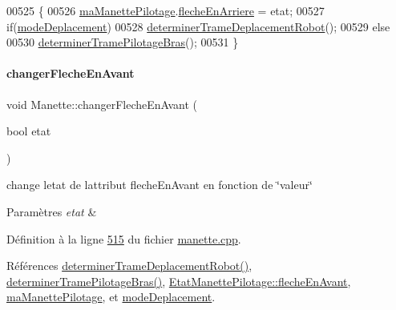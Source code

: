 \begin{DoxyCode}
00525 \{
00526     \hyperlink{class_manette_aeb3e02eaeaec4c656f78ed8fc6dae342}{maManettePilotage}.\hyperlink{struct_etat_manette_pilotage_ab7cce4480358d2e7ac189e96ab04b894}{flecheEnArriere} = etat;
00527     \textcolor{keywordflow}{if}(\hyperlink{class_manette_a4dc6231c8cc65fac03f59d323fa9a038}{modeDeplacement})
00528         \hyperlink{class_manette_a97a50caac68954a229c7e9461e7f4232}{determinerTrameDeplacementRobot}();
00529     \textcolor{keywordflow}{else}
00530         \hyperlink{class_manette_ab5eb6972f366aa7527b2b27da5539638}{determinerTramePilotageBras}();
00531 \}
\end{DoxyCode}
\mbox{\label{class_manette_aec3aca0f38959daec78db1f97f79c2d6}} 
\paragraph{\texorpdfstring{changer\+Fleche\+En\+Avant}{changerFlecheEnAvant}}
{\footnotesize\ttfamily void Manette\+::changer\+Fleche\+En\+Avant (\begin{DoxyParamCaption}\item[{bool}]{etat }\end{DoxyParamCaption})\hspace{0.3cm}{\ttfamily [slot]}}



change l\textquotesingle{}etat de l\textquotesingle{}attribut fleche\+En\+Avant en fonction de \char`\"{}valeur\char`\"{} 


\begin{DoxyParams}{Paramètres}
{\em etat} & \\
\hline
\end{DoxyParams}


Définition à la ligne \hyperlink{manette_8cpp_source_l00515}{515} du fichier \hyperlink{manette_8cpp_source}{manette.\+cpp}.



Références \hyperlink{manette_8cpp_source_l00341}{determiner\+Trame\+Deplacement\+Robot()}, \hyperlink{manette_8cpp_source_l00375}{determiner\+Trame\+Pilotage\+Bras()}, \hyperlink{manette_8h_source_l00152}{Etat\+Manette\+Pilotage\+::fleche\+En\+Avant}, \hyperlink{manette_8h_source_l00246}{ma\+Manette\+Pilotage}, et \hyperlink{manette_8h_source_l00253}{mode\+Deplacement}.


